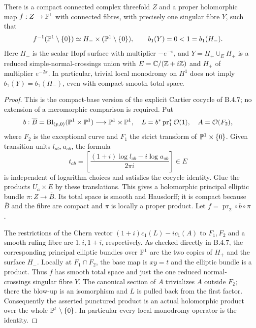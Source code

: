 \begin{proposition}
There is a compact connected complex threefold $Z$ and a proper
holomorphic map $f:Z\to\mathbb P^1$ with connected fibres, with precisely
one singular fibre $Y$, such that
\[
 f^{-1}(\mathbb P^1\setminus\{0\})
 \simeq H_-\times(\mathbb P^1\setminus\{0\}),\qquad
 b_1(Y)=0<1=b_1(H_-).
\]
Here $H_-$ is the scalar Hopf surface with multiplier $-e^{-\pi}$,
and $Y=H_+\cup_E H_+$ is a reduced simple-normal-crossings union
with $E=\mathbb C/(\mathbb Z+i\mathbb Z)$ and $H_+$ of multiplier $e^{-2\pi}$.
In particular, trivial local monodromy on $H^1$ does not imply
$b_1(Y)=b_1(H_-)$, even with compact smooth total space.
\end{proposition}
\begin{proof}
This is the compact-base version of the explicit Cartier cocycle
of B.4.7; no extension of a meromorphic comparison is required.
Put
\[
 b:\overline B=\operatorname{Bl}_{(p,0)}(\mathbb P^1\times\mathbb P^1)
      \longrightarrow\mathbb P^1\times\mathbb P^1,
 \quad L=b^*\operatorname{pr}_1^*\mathcal O(1),
 \quad A=\mathcal O(F_2),
\]
where $F_2$ is the exceptional curve and $F_1$ the strict transform
of $\mathbb P^1\times\{0\}$.  Given transition units $l_{ab},a_{ab}$,
the formula
\[
 t_{ab}=\left[
 \frac{(1+i)\log l_{ab}-i\log a_{ab}}{2\pi i}
 \right]\in E
\]
is independent of logarithm choices and satisfies the cocycle
identity.  Glue the products $U_a\times E$ by these translations.
This gives a holomorphic principal elliptic bundle
$\pi:Z\to\overline B$.  Its total space is smooth and Hausdorff;
it is compact because $\overline B$ and the fibre are compact and
$\pi$ is locally a proper product.  Let
$f=\operatorname{pr}_2\circ b\circ\pi$.

The restrictions of the Chern vector
$(1+i)c_1(L)-i c_1(A)$ to $F_1,F_2$ and a smooth ruling fibre
are $1,i,1+i$, respectively.  As checked directly in B.4.7,
the corresponding principal elliptic bundles over $\mathbb P^1$
are the two copies of $H_+$ and the surface $H_-$.  Locally
at $F_1\cap F_2$, the base map is $xy=t$ and the elliptic
bundle is a product.  Thus $f$ has smooth total space and just
the one reduced normal-crossings singular fibre $Y$.
The canonical section of $A$ trivializes $A$ outside $F_2$;
there the blow-up is an isomorphism and $L$ is pulled back
from the first factor.  Consequently the asserted punctured
product is an actual holomorphic product over the whole
$\mathbb P^1\setminus\{0\}$.  In particular every local monodromy
operator is the identity.


\end{proof}
